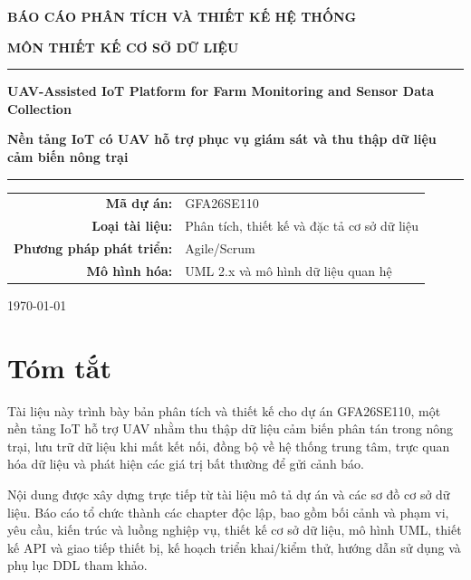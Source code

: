 \documentclass[12pt,a4paper,oneside]{report}
\begin{document}
\begin{titlepage}
\centering
\vspace*{1cm}
{\Large\bfseries BÁO CÁO PHÂN TÍCH VÀ THIẾT KẾ HỆ THỐNG\par}
\vspace{1.0cm}
{\Large\bfseries MÔN THIẾT KẾ CƠ SỞ DỮ LIỆU\par}
\vspace{1.5cm}
\rule{\textwidth}{1pt}\par
\vspace{0.5cm}
{\Huge\bfseries UAV-Assisted IoT Platform for Farm Monitoring and Sensor Data Collection\par}
\vspace{0.5cm}
{\Large\bfseries Nền tảng IoT có UAV hỗ trợ phục vụ giám sát và thu thập dữ liệu cảm biến nông trại\par}
\vspace{0.5cm}
\rule{\textwidth}{1pt}\par
\vspace{1.5cm}

\begin{tabular}{rl}
\textbf{Mã dự án:} & GFA26SE110\\
\textbf{Loại tài liệu:} & Phân tích, thiết kế và đặc tả cơ sở dữ liệu\\
\textbf{Phương pháp phát triển:} & Agile/Scrum\\
\textbf{Mô hình hóa:} & UML 2.x và mô hình dữ liệu quan hệ\\
\end{tabular}

\vfill
{\large \today\par}
\end{titlepage}

\chapter*{Tóm tắt}
Tài liệu này trình bày bản phân tích và thiết kế cho dự án GFA26SE110, một nền tảng IoT hỗ trợ UAV nhằm thu thập dữ liệu cảm biến phân tán trong nông trại, lưu trữ dữ liệu khi mất kết nối, đồng bộ về hệ thống trung tâm, trực quan hóa dữ liệu và phát hiện các giá trị bất thường để gửi cảnh báo.

Nội dung được xây dựng trực tiếp từ tài liệu mô tả dự án và các sơ đồ cơ sở dữ liệu. Báo cáo tổ chức thành các chapter độc lập, bao gồm bối cảnh và phạm vi, yêu cầu, kiến trúc và luồng nghiệp vụ, thiết kế cơ sở dữ liệu, mô hình UML, thiết kế API và giao tiếp thiết bị, kế hoạch triển khai/kiểm thử, hướng dẫn sử dụng và phụ lục DDL tham khảo.
\end{document}
